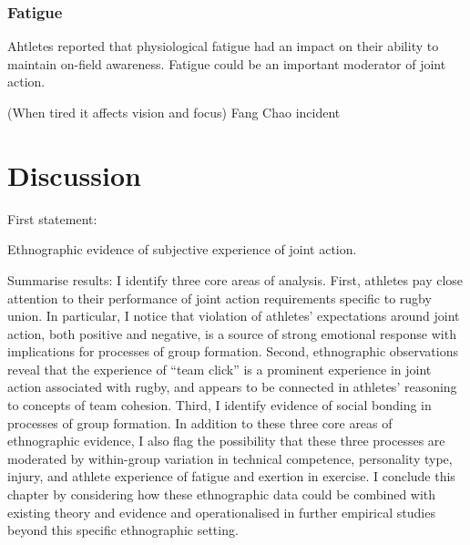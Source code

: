 \begin{CJK}{UTF8}{gbsn}
        \subsubsection{Fatigue}

Ahtletes reported that physiological fatigue had an impact on their ability to maintain on-field awareness.  Fatigue could be an important moderator of joint action.

(When tired it affects vision and focus)
Fang Chao incident






\section{Discussion}

First statement:

Ethnographic evidence of subjective experience of joint action.



Summarise results:
 I identify three core areas of analysis.  First, athletes pay close attention to their performance of joint action requirements specific to rugby union.  In particular, I notice that violation of athletes' expectations around joint action, both positive and negative, is a source of strong emotional response with implications for processes of group formation.  Second, ethnographic observations reveal that the experience of ``team click'' is a prominent experience in joint action associated with rugby, and appears to be connected in athletes' reasoning to concepts of team cohesion.  Third, I identify evidence of social bonding in processes of group formation.  In addition to these three core areas of ethnographic evidence, I also flag the possibility that these three processes are moderated by within-group variation in technical competence, personality type, injury, and athlete experience of fatigue and exertion in exercise.  I conclude this chapter by considering how these ethnographic data could be combined with existing theory and evidence and operationalised in further empirical studies beyond this specific ethnographic setting.


\end{CJK}
